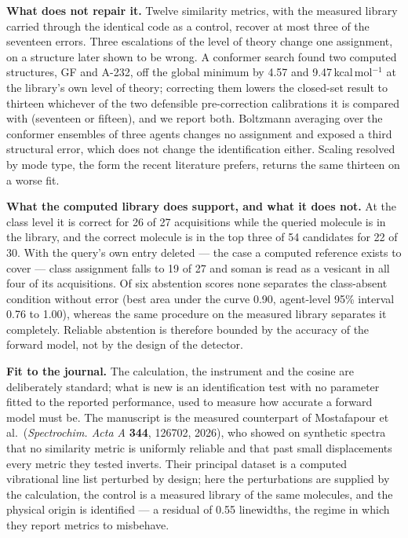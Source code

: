 \documentclass[11pt,a4paper]{article}
\begin{document}
\textbf{What does not repair it.} Twelve similarity metrics, with the measured library
carried through the identical code as a control, recover at most three of the seventeen
errors. Three escalations of the level of theory change one assignment, on a structure
later shown to be wrong. A conformer search found two computed structures, GF and A-232,
off the global minimum by 4.57 and 9.47\,kcal\,mol$^{-1}$ at the library's own level of
theory; correcting them lowers the closed-set result to thirteen whichever of the two
defensible pre-correction calibrations it is compared with (seventeen or fifteen), and we
report both. Boltzmann averaging over the conformer ensembles of three agents changes no assignment and exposed
a third structural error, which does not change the identification either. Scaling resolved
by mode type, the form the recent literature prefers, returns the same thirteen on a worse
fit.

\textbf{What the computed library does support, and what it does not.} At the class level
it is correct for 26 of 27 acquisitions while the queried molecule is in the library, and
the correct molecule is in the top three of 54 candidates for 22 of 30. With the query's
own entry deleted --- the case a computed reference exists to cover --- class assignment
falls to 19 of 27 and soman is read as a vesicant in all four of its acquisitions. Of six
abstention scores none separates the class-absent condition without error (best area under
the curve 0.90, agent-level 95\% interval 0.76 to 1.00), whereas the same procedure on the
measured library separates it completely. Reliable abstention is therefore bounded by the
accuracy of the forward model, not by the design of the detector.

\textbf{Fit to the journal.} The calculation, the instrument and the cosine are deliberately
standard; what is new is an identification test with no parameter fitted to the reported
performance, used to measure how accurate a forward model must be. The manuscript is the
measured counterpart of Mostafapour et al.\ (\textit{Spectrochim. Acta A} \textbf{344},
126702, 2026), who showed on synthetic spectra that no similarity metric is uniformly
reliable and that past small displacements every metric they tested inverts. Their
principal dataset is a computed vibrational line list perturbed by design; here the
perturbations are supplied by the calculation, the control is a measured library of the
same molecules, and the physical origin is identified --- a residual of 0.55 linewidths,
the regime in which they report metrics to misbehave.
\end{document}
